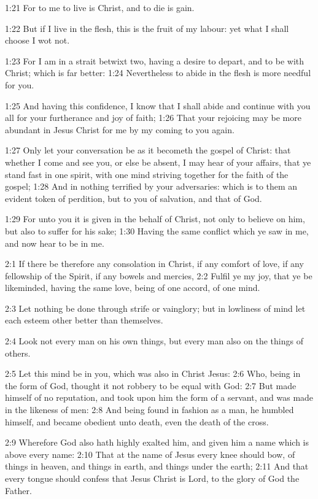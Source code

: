 1:21 For to me to live is Christ, and to die is gain.

1:22 But if I live in the flesh, this is the fruit of my labour: yet what I shall choose I wot not.

1:23 For I am in a strait betwixt two, having a desire to depart, and to be with Christ; which is far better: 1:24 Nevertheless to abide in the flesh is more needful for you.

1:25 And having this confidence, I know that I shall abide and continue with you all for your furtherance and joy of faith; 1:26 That your rejoicing may be more abundant in Jesus Christ for me by my coming to you again.

1:27 Only let your conversation be as it becometh the gospel of Christ: that whether I come and see you, or else be absent, I may hear of your affairs, that ye stand fast in one spirit, with one mind striving together for the faith of the gospel; 1:28 And in nothing terrified by your adversaries: which is to them an evident token of perdition, but to you of salvation, and that of God.

1:29 For unto you it is given in the behalf of Christ, not only to believe on him, but also to suffer for his sake; 1:30 Having the same conflict which ye saw in me, and now hear to be in me.

2:1 If there be therefore any consolation in Christ, if any comfort of love, if any fellowship of the Spirit, if any bowels and mercies, 2:2 Fulfil ye my joy, that ye be likeminded, having the same love, being of one accord, of one mind.

2:3 Let nothing be done through strife or vainglory; but in lowliness of mind let each esteem other better than themselves.

2:4 Look not every man on his own things, but every man also on the things of others.

2:5 Let this mind be in you, which was also in Christ Jesus: 2:6 Who, being in the form of God, thought it not robbery to be equal with God: 2:7 But made himself of no reputation, and took upon him the form of a servant, and was made in the likeness of men: 2:8 And being found in fashion as a man, he humbled himself, and became obedient unto death, even the death of the cross.

2:9 Wherefore God also hath highly exalted him, and given him a name which is above every name: 2:10 That at the name of Jesus every knee should bow, of things in heaven, and things in earth, and things under the earth; 2:11 And that every tongue should confess that Jesus Christ is Lord, to the glory of God the Father.

